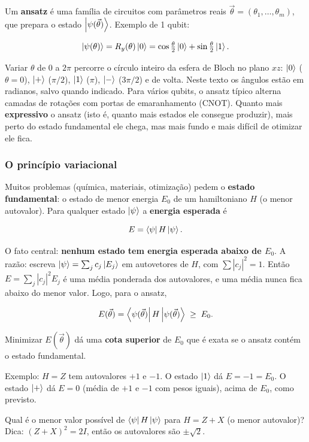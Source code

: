 Um \textbf{ansatz} é uma família de circuitos com parâmetros reais \(\vec\theta = (\theta_1,\dots,\theta_m)\), que prepara o estado \(\left|{\psi(\vec\theta)}\right>\). Exemplo de 1 qubit:

\[
\left|{\psi(\theta)}\right> = R_y(\theta)\left|{0}\right> = \cos\tfrac{\theta}{2}\left|{0}\right> + \sin\tfrac{\theta}{2}\left|{1}\right>.
\]

Variar \(\theta\) de \(0\) a \(2\pi\) percorre o círculo inteiro da esfera de Bloch no plano \(xz\): \(\left|{0}\right>\) (\(\theta=0\)), \(\left|{+}\right>\) (\(\pi/2\)), \(\left|{1}\right>\) (\(\pi\)), \(\left|{-}\right>\) (\(3\pi/2\)) e de volta. Neste texto os ângulos estão em radianos, salvo quando indicado. Para vários qubits, o ansatz típico alterna camadas de rotações com portas de emaranhamento (CNOT). Quanto mais \textbf{expressivo} o ansatz (isto é, quanto mais estados ele consegue produzir), mais perto do estado fundamental ele chega, mas mais fundo e mais difícil de otimizar ele fica.

\subsubsection{O princípio variacional}\label{o-princuxedpio-variacional}

Muitos problemas (química, materiais, otimização) pedem o \textbf{estado fundamental}: o estado de menor energia \(E_0\) de um hamiltoniano \(H\) (o menor autovalor). Para qualquer estado \(\left|{\psi}\right>\) a \textbf{energia esperada} é

\[
E = \left<{\psi}\right|H\left|{\psi}\right>.
\]

O fato central: \textbf{nenhum estado tem energia esperada abaixo de \(E_0\)}. A razão: escreva \(\left|{\psi}\right> = \sum_j c_j\left|{E_j}\right>\) em autovetores de \(H\), com \(\sum|c_j|^2=1\). Então \(E = \sum_j |c_j|^2 E_j\) é uma média ponderada dos autovalores, e uma média nunca fica abaixo do menor valor. Logo, para o ansatz,

\[
E(\vec\theta) = \left<{\psi(\vec\theta)}\right|H\left|{\psi(\vec\theta)}\right> \;\ge\; E_0.
\]

Minimizar \(E(\vec\theta)\) dá uma \textbf{cota superior} de \(E_0\) que é exata se o ansatz contém o estado fundamental.

Exemplo: \(H = Z\) tem autovalores \(+1\) e \(-1\). O estado \(\left|{1}\right>\) dá \(E=-1=E_0\). O estado \(\left|{+}\right>\) dá \(E = 0\) (média de \(+1\) e \(-1\) com pesos iguais), acima de \(E_0\), como previsto.

Qual é o menor valor possível de \(\left<{\psi}\right|H\left|{\psi}\right>\) para \(H = Z + X\) (o menor autovalor)? Dica: \((Z+X)^2 = 2I\), então os autovalores são \(\pm\sqrt2\).

